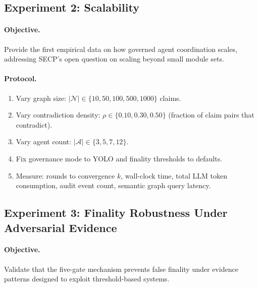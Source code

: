 \documentclass[11pt]{article}
\begin{document}
\subsection{Experiment 2: Scalability}

\paragraph{Objective.} Provide the first empirical data on how governed agent coordination scales, addressing SECP's open question on scaling beyond small module sets.

\paragraph{Protocol.}
\begin{enumerate}
  \item Vary graph size: $|\mathcal{N}| \in \{10, 50, 100, 500, 1000\}$ claims.
  \item Vary contradiction density: $\rho \in \{0.10, 0.30, 0.50\}$ (fraction of claim pairs that contradict).
  \item Vary agent count: $|\mathcal{A}| \in \{3, 5, 7, 12\}$.
  \item Fix governance mode to YOLO and finality thresholds to defaults.
  \item Measure: rounds to convergence $k$, wall-clock time, total LLM token consumption, audit event count, semantic graph query latency.
\end{enumerate}

\subsection{Experiment 3: Finality Robustness Under Adversarial Evidence}

\paragraph{Objective.} Validate that the five-gate mechanism prevents false finality under evidence patterns designed to exploit threshold-based systems.
\end{document}
